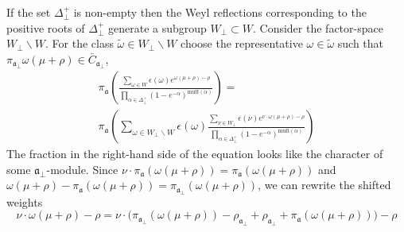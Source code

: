 \documentclass[a4paper,12pt]{article}
\theoremstyle{definition} \newtheorem{Def}{Definition}
\begin{document}
If the set $\Delta^{+}_{\bot}$ is non-empty then the Weyl reflections corresponding to the positive roots of $\Delta^{+}_{\bot}$ generate a subgroup $W_{\bot}\subset W$.
Consider the factor-space $W_{\bot}\backslash W$. For the class $\tilde{\omega}\in W_{\bot}\backslash W$ choose the representative $\omega \in \tilde{\omega}$ such that $\pi_{\mathfrak{a}_{\bot}}\omega(\mu+\rho)\in \bar{C}_{\mathfrak{a}_{\bot}}$,
\begin{multline}
  \label{eq:13}
 \pi_{\mathfrak{a}}\left(\frac{\sum_{\omega\in W} \epsilon(\omega) e^{\omega(\mu+\rho)-\rho}}{\prod_{\alpha\in\Delta^{+}_{\bot}}(1-e^{-\alpha})^{\mathrm{mult}(\alpha)}}\right) = \\
 \pi_{\mathfrak{a}}\left(\sum_{\omega\in W_{\bot}\backslash W} \epsilon(\omega) \frac{\sum_{\nu\in W_{\bot}}\epsilon(\nu) e^{\nu \cdot \omega(\mu+\rho)-\rho}}{\prod_{\alpha\in\Delta^{+}_{\bot}}(1-e^{-\alpha})^{\mathrm{mult}(\alpha)}}\right)
\end{multline}
The fraction in the right-hand side of the equation looks like the character of some  $\mathfrak{a}_{\bot}$-module.
Since $\nu\cdot \pi_{\mathfrak{a}}(\omega(\mu+\rho))=\pi_{\mathfrak{a}}(\omega(\mu+\rho))$ and $\omega(\mu+\rho)-\pi_{\mathfrak{a}}(\omega(\mu+\rho))=\pi_{\mathfrak{a}_{\bot}}(\omega(\mu+\rho))$, we can rewrite the shifted weights
\begin{equation}
  \label{eq:30}
  \nu\cdot\omega(\mu+\rho)-\rho=\nu\cdot \bigl(\pi_{\mathfrak{a}_{\bot}}(\omega(\mu+\rho))-\rho_{\mathfrak{a}_{\bot}}+\rho_{\mathfrak{a}_{\bot}}+\pi_{\mathfrak{a}}(\omega(\mu+\rho))\bigr)-\rho
\end{equation}
\end{document}
